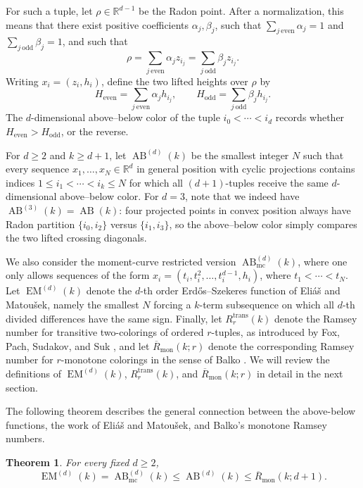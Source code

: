 \documentclass[11pt]{article}
\newtheorem{theorem}{Theorem}
\begin{document}
For such a tuple, let $\rho\in\mathbb R^{d-1}$ be the Radon point. After a normalization, this means that there exist positive coefficients $\alpha_j,\beta_j$, such that $\sum_{j\ \mathrm{even}}\alpha_j=1$ and $\sum_{j\ \mathrm{odd}}\beta_j=1$, and such that
\[
\rho
=
\sum_{j\ \mathrm{even}}\alpha_j z_{i_j}
=
\sum_{j\ \mathrm{odd}}\beta_j z_{i_j}.
\]
Writing $x_i=(z_i,h_i)$, define the two lifted heights over $\rho$ by
\[
H_{\mathrm{even}}
=
\sum_{j\ \mathrm{even}}\alpha_j h_{i_j},
\qquad
H_{\mathrm{odd}}
=
\sum_{j\ \mathrm{odd}}\beta_j h_{i_j}.
\]
The $d$-dimensional above--below color of the tuple $i_0<\cdots<i_d$ records whether $H_{\mathrm{even}}>H_{\mathrm{odd}}$, or the reverse.

For $d\ge 2$ and $k\ge d+1$, let $\operatorname{AB}^{(d)}(k)$ be the smallest integer $N$ such that every sequence $x_1,\dots,x_N\in\mathbb R^d$ in general position with cyclic projections contains indices $1\le i_1<\cdots<i_k\le N$ for which all $(d+1)$-tuples receive the same $d$-dimensional above--below color. For $d=3$, note that we indeed have $\operatorname{AB}^{(3)}(k)=\operatorname{AB}(k)$: four projected points in convex position always have Radon partition $\{i_0,i_2\}$ versus $\{i_1,i_3\}$, so the above--below color simply compares the two lifted crossing diagonals.

We also consider the moment-curve restricted version
$\operatorname{AB}^{(d)}_{\mathrm{mc}}(k)$, where one only allows sequences of the
form $x_i=(t_i,t_i^2,\dots,t_i^{d-1},h_i)$, where
$t_1<\cdots<t_N$. Let $\operatorname{EM}^{(d)}(k)$ denote the $d$-th order
Erd\H{o}s--Szekeres function of Eli\'a\v{s} and Matou\v{s}ek, namely the smallest
$N$ forcing a $k$-term subsequence on which all $d$-th divided differences have
the same sign. Finally, let $R^{\mathrm{trans}}_r(k)$ denote the Ramsey number
for transitive two-colorings of ordered $r$-tuples, as introduced by Fox, Pach,
Sudakov, and Suk \cite[Section 6]{FPSS}, and let
$\overline R_{\mathrm{mon}}(k;r)$ denote the corresponding Ramsey number for
$r$-monotone colorings in the sense of Balko \cite{Balko}. We will review the definitions of $\operatorname{EM}^{(d)}(k)$,
$R^{\mathrm{trans}}_r(k)$, and $\overline R_{\mathrm{mon}}(k;r)$ in detail in the next section.

The following theorem describes the general connection between the above-below functions, the work of Eli\'a\v{s} and Matou\v{s}ek, and Balko's monotone Ramsey
numbers.

\begin{theorem}\label{thm:higher-dimensional}
For every fixed $d\ge 2$,
\[
\operatorname{EM}^{(d)}(k)
=
\operatorname{AB}^{(d)}_{\mathrm{mc}}(k)
\le
\operatorname{AB}^{(d)}(k)
\le
\overline R_{\mathrm{mon}}(k;d+1).
\]
\end{theorem}
\end{document}
